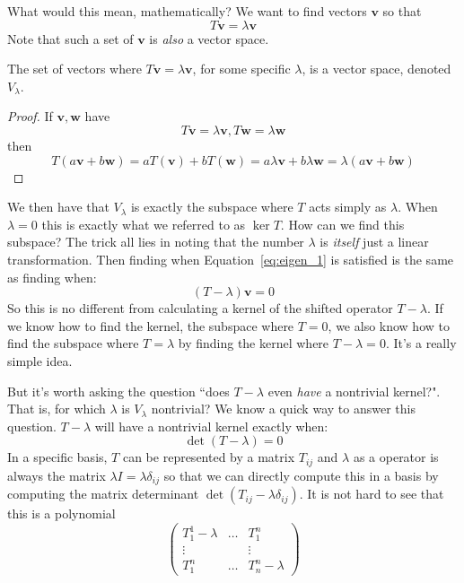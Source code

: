 	
	What would this mean, mathematically? We want to find vectors $\mathbf v$ so that
	\begin{equation}\label{eq:eigen_1}
		T \mathbf v = \lambda \mathbf v
	\end{equation}
	Note that such a set of $\mathbf v$ is \emph{also} a vector space.
	\begin{prop}
	The set of vectors where $T \mathbf v = \lambda \mathbf v$, for some specific $\lambda$, is a vector space, denoted $V_\lambda$. 
	\end{prop}
	\begin{proof}
		If $\mathbf v, \mathbf w$ have
		\begin{equation*}
			T \mathbf v = \lambda \mathbf v, T \mathbf w = \lambda \mathbf w
		\end{equation*}
		then
		\begin{equation*}
			T(a \mathbf v + b \mathbf w) = a T(\mathbf v) + b T(\mathbf w) = a \lambda \mathbf v + b \lambda \mathbf w = \lambda(a \mathbf v + b \mathbf w)
		\end{equation*}
	\end{proof}
	We then have that $V_\lambda$ is exactly the subspace where $T$ acts simply as $\lambda$.
	When $\lambda = 0$ this is exactly what we referred to as $\ker T$. How can we find this subspace? The trick all lies in noting that the number $\lambda$ is \emph{itself} just a linear transformation. Then finding when Equation~\eqref{eq:eigen_1} is satisfied is the same as finding when:
	\begin{equation}
		(T - \lambda) \mathbf v = 0
	\end{equation}
	So this is no different from calculating a kernel of the shifted operator $T - \lambda$. If we know how to find the kernel, the subspace where $T = 0$, we also know how to find the subspace where $T = \lambda$ by finding the kernel where $T - \lambda = 0$. It's a really simple idea.
	
	But it's worth asking the question ``does $T-\lambda$ even \emph{have} a nontrivial kernel?". That is, for which $\lambda$ is $V_\lambda$ nontrivial? We know a quick way to answer this question. $T - \lambda$ will have a nontrivial kernel exactly when:
	\begin{equation}
		\det ( T - \lambda ) = 0
	\end{equation}
	In a specific basis, $T$ can be represented by a matrix $T_{ij}$ and $\lambda$ as a operator is always the matrix $\lambda I = \lambda \delta_{ij}$ so that we can directly compute this in a basis by computing the matrix determinant $\det(T_{ij} - \lambda \delta_{ij})$. It is not hard to see that this is a polynomial 
	\begin{equation}
		\begin{pmatrix}
			T_{1}^1 - \lambda & \dots & T_{1}^n\\
			\vdots &	   & \vdots\\
			T_{1}^n & \dots & T_{n}^n - \lambda 
		\end{pmatrix}
	\end{equation}
	
